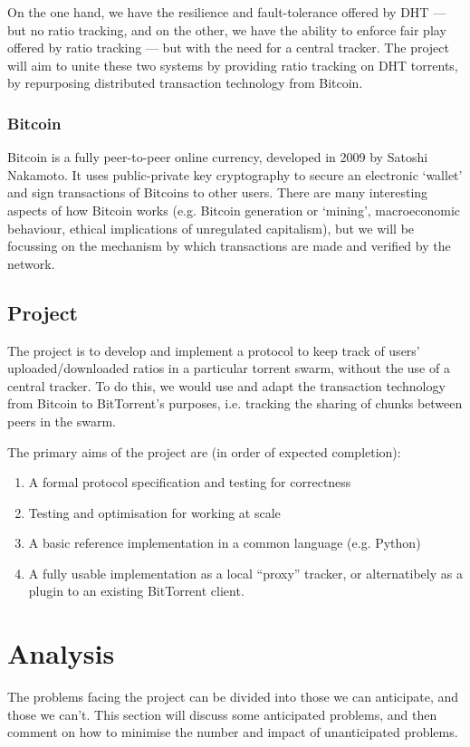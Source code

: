 \documentclass{article}
\begin{document}
On the one hand, we have the resilience and fault-tolerance offered by DHT --- but no ratio tracking, and on the other, we have the ability to enforce fair play offered by ratio tracking --- but with the need for a central tracker.  The project will aim to unite these two systems by providing ratio tracking on DHT torrents, by repurposing distributed transaction technology from Bitcoin.

\subsubsection{Bitcoin}
Bitcoin is a fully peer-to-peer online currency, developed in 2009 by Satoshi Nakamoto.  It uses public-private key cryptography to secure an electronic `wallet' and sign transactions of Bitcoins to other users.  There are many interesting aspects of how Bitcoin works (e.g. Bitcoin generation or `mining', macroeconomic behaviour, ethical implications of unregulated capitalism), but we will be focussing on the mechanism by which transactions are made and verified by the network.

\subsection{Project}

The project is to develop and implement a protocol to keep track of users' uploaded/downloaded ratios in a particular torrent swarm, without the use of a central tracker.  To do this, we would use and adapt the transaction technology from Bitcoin to BitTorrent's purposes, i.e. tracking the sharing of chunks between peers in the swarm.


The primary aims of the project are (in order of expected completion):
\begin{enumerate}
\item A formal protocol specification and testing for correctness
\item Testing and optimisation for working at scale
\item A basic reference implementation in a common language (e.g. Python)
\item A fully usable implementation as a local ``proxy'' tracker, or alternatibely as a plugin to an existing BitTorrent client.
\end{enumerate}

\section{Analysis}
The problems facing the project can be divided into those we can anticipate, and those we can't.  This section will discuss some anticipated problems, and then comment on how to minimise the number and impact of unanticipated problems.
\end{document}
